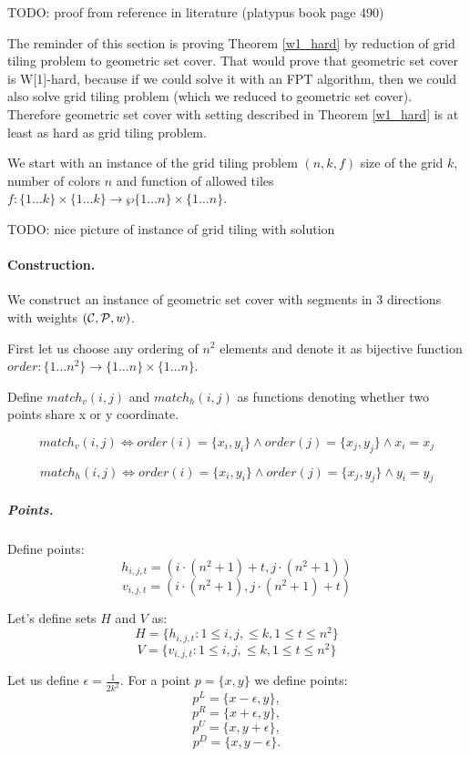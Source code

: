 TODO: proof from reference in literature (platypus book page 490)

The reminder of this section is proving Theorem \ref{w1_hard}
by reduction of grid tiling problem to geometric set cover.
That would prove that geometric set cover is W[1]-hard,
because if we could solve it with an FPT algorithm,
then we could also solve grid tiling problem
(which we reduced to geometric set cover).
Therefore geometric set cover with setting
described in Theorem \ref{w1_hard}
is at least as hard as grid tiling problem.

We start with an instance of the grid tiling problem $(n, k, f)$
size of the
grid $k$, number of colors $n$
and function of allowed tiles
$f : \{1 \ldots k\} \times \{1 \ldots k\} \rightarrow \wp\{1 \ldots n\} \times \{1 \ldots n\}$.

TODO: nice picture of instance of grid tiling with solution

\paragraph{Construction.}
We construct an instance of geometric set cover with segments in 3 directions
with weights $(\mathcal{C}, \mathcal{P}, w)$.

First let us choose any ordering of $n^2$ elements
and denote it as bijective function
$order : \{1 \ldots n^2\} \rightarrow \{1 \ldots n\} \times \{1 \ldots n\}$.

Define $match_v(i, j)$ and $match_h(i, j)$
as functions denoting whether two points share x or y coordinate.

$$match_v(i, j) \iff
order(i) = \{x_i, y_i\} \land order(j) = \{x_j, y_j\} \land x_i = x_j$$

$$match_h(i, j) \iff
order(i) = \{x_i, y_i\} \land order(j) = \{x_j, y_j\} \land y_i = y_j$$


\subparagraph{Points.}

Define points:
	$$h_{i, j, t} = (i \cdot (n^2+1) + t, j \cdot (n^2+1))$$
	$$v_{i, j, t} = (i \cdot (n^2+1), j \cdot (n^2+1) + t)$$
	
Let's define sets $H$ and $V$ as:
$$H = \{h_{i, j, t} : 1 \le i, j, \le k, 1 \le t \le n^2\}$$
$$V = \{v_{i, j, t} : 1 \le i, j, \le k, 1 \le t \le n^2\}$$
	
Let us define $\epsilon = \frac{1}{2k^2}$.
For a point $p = \{x, y\}$ we define points:
$$p^{L} = \{x - \epsilon, y\},$$
$$p^{R} = \{x + \epsilon, y\},$$
$$p^{U} = \{x, y + \epsilon\},$$
$$p^{D} = \{x, y - \epsilon\}.$$

